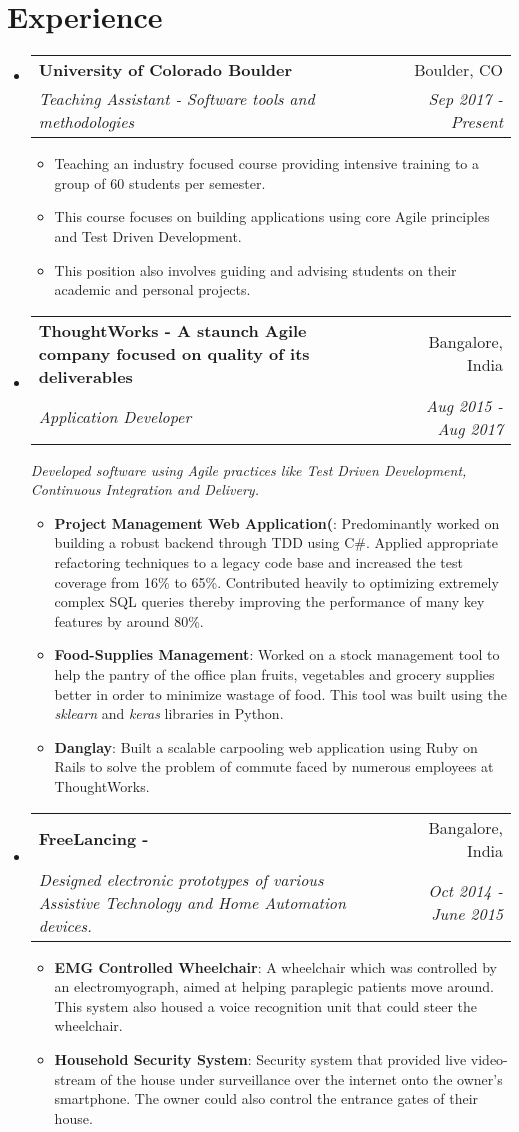 \documentclass[letterpaper,11pt]{article}
\makeatletter
\newcommand{\resumeItem}[2]{
  \item\small{
    \textbf{#1}{: #2 \vspace{-2pt}}
  }
}
\newcommand{\resumePoint}[1]{
  \item\small{#1}
}
\newcommand{\resumeSubheading}[4]{
  \vspace{-1pt}\item
    \begin{tabular*}{0.97\textwidth}{l@{\extracolsep{\fill}}r}
      \textbf{#1} & #2 \\
      \textit{\small#3} & \textit{\small #4} \\
    \end{tabular*}\vspace{-2pt}
}
\newcommand{\resumeSubheadingWithDescription}[5]{
  \vspace{-1pt}\item
    \begin{tabular*}{0.97\textwidth}{l@{\extracolsep{\fill}}r}
      \textbf{#1} & #2 \\
      \textit{\small#3} & \textit{\small #4} \\
    \end{tabular*}\vspace{2pt}
    \textit{\small#5}\vspace{0pt}
}
\newcommand{\resumeSubHeadingListStart}{\begin{itemize}[leftmargin=*]}
\newcommand{\resumeSubHeadingListEnd}{\end{itemize}\vspace{-10pt}}
\newcommand{\resumeItemListStart}{\begin{itemize}\vspace{-4pt}}
\newcommand{\resumeItemListEnd}{\end{itemize}\vspace{-5pt}}
\makeatother
\begin{document}

\section{Experience}
  \resumeSubHeadingListStart
    \resumeSubheading
      {University of Colorado Boulder}{Boulder, CO}
      {Teaching Assistant - Software tools and methodologies}{Sep 2017 - Present}
      \resumeItemListStart
          \resumePoint{Teaching an industry focused course providing intensive training to a group of 60 students per semester.
          }
          \resumePoint{This course focuses on building applications using core Agile principles and Test Driven Development.
          }
          \resumePoint{This position also involves guiding and advising students on their academic and personal projects.
          }
      \resumeItemListEnd
    \resumeSubheadingWithDescription
      {ThoughtWorks - \normalfont A staunch Agile company focused on quality of its deliverables}{Bangalore, India}
      {Application Developer}{Aug 2015 - Aug 2017}
      {Developed software using Agile practices like Test Driven Development, Continuous Integration and Delivery.}
      \resumeItemListStart
      \resumeItem{Project Management Web Application(\normalfont{for the largest consulting firm in the world)}}
      {Predominantly worked on building a robust backend through TDD using C\#. Applied appropriate refactoring techniques to a legacy code base and increased the test coverage from 16\% to 65\%. Contributed heavily to optimizing extremely complex SQL queries thereby improving the performance of many key features by around 80\%.}
      \resumeItem{Food-Supplies Management}{Worked on a stock management tool to help the pantry of the office plan fruits, vegetables and grocery supplies better in order to minimize wastage of food. This tool was built using the \emph{sklearn} and \emph{keras} libraries in Python.}
      \resumeItem{Danglay}{Built a scalable carpooling web application using Ruby on Rails to solve the problem of commute faced by numerous employees at ThoughtWorks.}
      \resumeItemListEnd
    \resumeSubheading
      {FreeLancing - \normalfont{Embedded System Prototyping}}{Bangalore, India}
      {Designed electronic prototypes of various Assistive Technology and Home Automation devices.}{Oct 2014 - June 2015}
      \resumeItemListStart
          \resumeItem{EMG Controlled Wheelchair}{A wheelchair which was controlled by an electromyograph, aimed at helping paraplegic patients move around. This system also housed a voice recognition unit that could steer the wheelchair.}
          \resumeItem{Household Security System}{Security system that provided live video-stream of the house under surveillance over the internet onto the owner's smartphone. The owner could also control the entrance gates of their house.}
      \resumeItemListEnd
  \resumeSubHeadingListEnd
\end{document}
